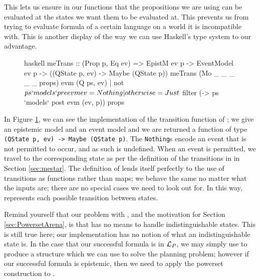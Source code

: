 \documentclass[10pt, a4paper]{report}
\begin{document}
This lets us ensure in our functions that the propositions we are using can be
evaluated at the states we want them to be evaluated at. This prevents us from
trying to evaluate formula of a certain language on a world it is incompatible
with. This is another display of the way we can use Haskell's type system to our
advantage. 

\begin{figure}[h]
\begin{cminted}{haskell}
  meTrans :: (Prop p, Eq ev) =>
          EpistM ev p -> EventModel ev p -> ((QState p, ev) -> Maybe (QState p))
  meTrans (Mo _ _ _ _ _ props) evm    (Q ps, ev)
    | not $ ps `models` pre evm ev  = Nothing
    | otherwise                     = Just $ filter (\p -> ps `models` post evm (ev, p)) props
\end{cminted}
  \caption{}
  \label{fig:metrans}
\end{figure}

In Figure \ref{fig:metrans}, we can see the implementation of the transition
function of \mestar; we give an epistemic model and an event model and we are
returned a function of type \texttt{(QState p, ev) -> Maybe (QState
  p)}. The \texttt{Nothing}s encode an event that is not permitted to
occur, and as such is undefined. When an event is permitted, we travel to the
corresponding state as per the definition of the transitions in \mestar in
Section \ref{sec:mestar}. The definition of \mestar lends itself perfectly to
the use of transitions as functions rather than maps; we behave the same no
matter what the inputs are; there are no special cases we need to look out for.
In this way, \mestar represents each possible transition between states. 

Remind yourself that our problem with \mestar, and the motivation for Section
\ref{sec:PowersetArena}, is that \mestar has no means to handle
indistinguishable states. This is still true here; our implementation has no
notion of what an indistinguishable state is. In the case that our successful
formula is in $\mathcal{L}_P$, we may simply use \mestar to produce a structure which
we can use to solve the planning problem; however if our successful formula is
epistemic, then we need to apply the powerset construction to \mestar. 

\section{}
\end{document}
